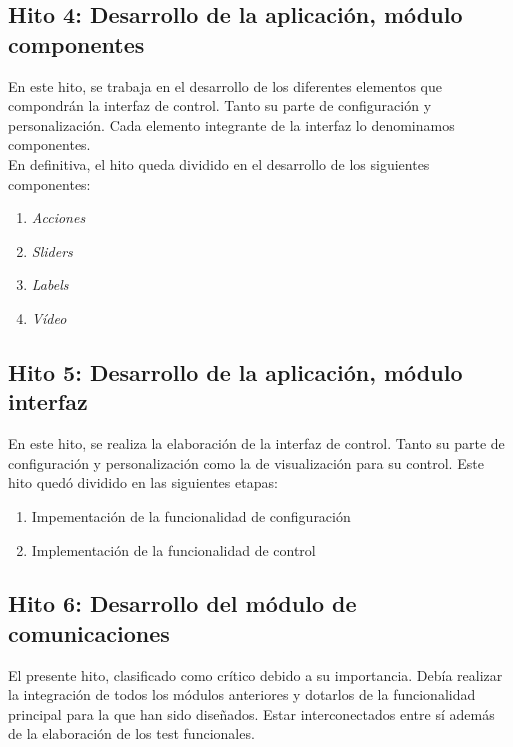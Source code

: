 \begin{enumerate}
\subsection{ Hito 4: Desarrollo de la aplicación, módulo componentes }
\label{subsec:hito4}

En este hito, se trabaja en el desarrollo de los diferentes elementos que compondrán la interfaz de control. Tanto su parte de configuración y personalización. 
Cada elemento integrante de la interfaz lo denominamos componentes.\\

En definitiva, el hito queda dividido en el desarrollo de los siguientes componentes:

\begin{enumerate}
 \item \emph{Acciones}
 \item \emph{Sliders}
 \item \emph{Labels}
 \item \emph{Vídeo}
\end{enumerate}


\subsection{Hito 5: Desarrollo de la aplicación, módulo interfaz }
\label{subsec:hito5}

En este hito, se realiza la elaboración de la interfaz de control. Tanto su parte de configuración y personalización como la de visualización para su control. Este hito quedó dividido 
en las siguientes etapas:

\begin{enumerate}
 \item Impementación de la funcionalidad de configuración
 \item Implementación de la funcionalidad de control
\end{enumerate}


\subsection{Hito 6: Desarrollo del módulo de comunicaciones }
\label{subsec:hito6}

El presente hito, clasificado como crítico debido a su importancia. Debía realizar la integración de todos los módulos anteriores y dotarlos de la funcionalidad principal para la que han sido diseñados. Estar interconectados 
entre sí además de la elaboración de los test funcionales.


\end{enumerate}
